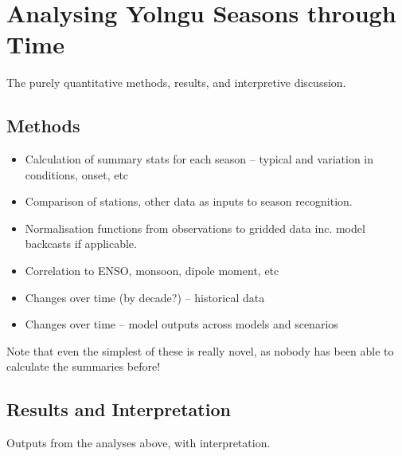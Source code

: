 \chapter{Analysing Yolngu Seasons through Time}
\label{ch:analysis}

The purely quantitative methods, results, and interpretive discussion.

\section{Methods}

\begin{itemize}
\item Calculation of summary stats for each season – typical and variation in conditions, onset, etc
\item Comparison of stations, other data as inputs to season recognition.
\item Normalisation functions from observations to gridded data inc. model backcasts if applicable.
\item Correlation to ENSO, monsoon, dipole moment, etc
\item Changes over time (by decade?) – historical data
\item Changes over time – model outputs across models and scenarios
\end{itemize}

Note that even the simplest of these is really novel, as nobody has been able to calculate the summaries before!

\section{Results and Interpretation}
Outputs from the analyses above, with interpretation.

